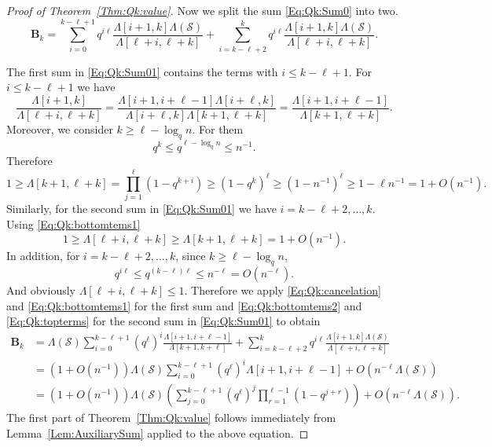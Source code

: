\documentclass[10pt,a4paper]{amsart}
\newcommand{\bB}{\mathbf{B}}
\newcommand{\cS}{\mathcal{S}}
\renewcommand{\ge}{\geqslant}
\renewcommand{\le}{\leqslant}
\newcommand{\product}{\Lambda}
\newcommand{\productO}{\Lambda(\cS)}
\begin{document}
\begin{proof}[Proof of Theorem~\ref{Thm:Qk:value}]
	Now we split the sum \eqref{Eq:Qk:Sum0} into two. 
	\begin{equation}\label{Eq:Qk:Sum01}
		\bB_{k}=\sum_{i=0}^{k-\ell+1} q^{i\ell}\frac{\product[i+1,k]\productO}{\product[\ell+i,\ell+k]}+\sum_{i=k-\ell+2}^{k} q^{i\ell}\frac{\product[i+1,k]\productO}{\product[\ell+i,\ell+k]}.
	\end{equation}
	
	
	The first sum in \eqref{Eq:Qk:Sum01} contains the terms with $i\le k-\ell+1$. For $i\le k-\ell+1$ we have
	\begin{equation}\label{Eq:Qk:cancelation}
		\frac{\product[i+1,k]}{\product[\ell+i,\ell+k]}
		=
		\frac{\product[i+1,i+\ell-1]\product[i+\ell,k]}{\product[i+\ell,k]\product[k+1,\ell+k]}
		=\frac{\product[i+1,i+\ell-1]}{\product[k+1,\ell+k]}.
	\end{equation}
	Moreover, we consider $k\ge \ell -\log_q n$. For them
	\[
	q^k\le q^{\ell-\log_q n}\le n^{-1}.\]
	Therefore
	\begin{equation}\label{Eq:Qk:bottomtems1}  
		1\ge\product[k+1,\ell+k] = \prod_{j=1}^{\ell}(1-q^{k+i}) \ge (1-q^{k})^\ell \ge (1-n^{-1})^\ell\ge 1-\ell n^{-1}=1+O(n^{-1}).
	\end{equation}
	Similarly, for the second sum in \eqref{Eq:Qk:Sum01} we have $i=k-\ell+2,\ldots,k$.  Using \eqref{Eq:Qk:bottomtems1} 
	\begin{equation}\label{Eq:Qk:bottomtems2}  
		1\ge \product[\ell+i,\ell+k]\ge \product[k+1,\ell+k] = 1+O(n^{-1}).
	\end{equation}
	In addition, for $i=k-\ell+2,\ldots,k$, since $k\ge \ell -\log_q n$,
	\begin{equation}\label{Eq:Qk:topterms}
		q^{i\ell}\le q^{(k-\ell)\ell}\le n^{-\ell}=O(n^{-\ell}). 
	\end{equation}
	And obviously $\product[\ell+i,\ell+k]\le 1$. Therefore
	we apply \eqref{Eq:Qk:cancelation} and \eqref{Eq:Qk:bottomtems1} for the first sum and \eqref{Eq:Qk:bottomtems2} and \eqref{Eq:Qk:topterms} for the second sum in \eqref{Eq:Qk:Sum01} to obtain
	\begin{equation}\label{Eq:Qk:Sum1}
		\begin{split}
			\bB_{k}
			&=\productO\sum_{i=0}^{k-\ell+1}\left(q^{\ell}\right)^i\frac{\product[i+1,i+\ell-1]}{\product[k+1,k+\ell]}+\sum_{i=k-\ell+2}^{k}q^{i\ell}\frac{\product[i+1,k]\productO}{\product[\ell+i,\ell+k]}\\
			&=(1+O(n^{-1}))\productO\sum_{i=0}^{k-\ell+1}\left(q^{\ell}\right)^i\product[i+1,i+\ell-1]+O(n^{-\ell}\productO)\\
			&=(1+O(n^{-1}))\productO\left(\sum_{j=0}^{k-\ell+1}\left(q^{\ell}\right)^j\prod_{r=1}^{\ell-1}(1-q^{j+r})\right)+O(n^{-\ell}\productO).
		\end{split}
	\end{equation}
	The first part of Theorem~\ref{Thm:Qk:value} follows immediately from Lemma~\ref{Lem:AuxiliarySum} applied to the above equation.
	

\end{proof}
\end{document}
